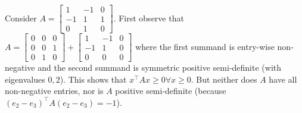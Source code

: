 \begin{enumerate}[leftmargin=*]
Consider $A = \begin{bmatrix}1&-1&0\\-1&1&1\\0&1&0\end{bmatrix}$. First observe that $A = \begin{bmatrix}0&0&0\\0&0&1\\0&1&0\end{bmatrix} + \begin{bmatrix}1&-1&0\\-1&1&0\\0&0&0\end{bmatrix}$ where the first summand is entry-wise non-negative and the second summand is symmetric positive semi-definite (with eigenvalues $0,2$). This shows that $x^\top Ax\geq 0\forall x\geq 0$. But neither does $A$ have all non-negative entries, nor is $A$ positive semi-definite (because $(e_2-e_3)^\top A(e_2-e_3) = -1$).
\end{enumerate}

{\label{imgcom}}


